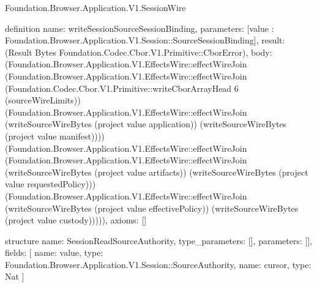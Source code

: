 \begin{lexlean}{Foundation.Browser.Application.V1.SessionWire}
\begin{semanticmodule}
definition{
  name: writeSessionSourceSessionBinding,
  parameters: [value : Foundation.Browser.Application.V1.Session::SourceSessionBinding],
  result: (Result Bytes Foundation.Codec.Cbor.V1.Primitive::CborError),
  body: (Foundation.Browser.Application.V1.EffectsWire::effectWireJoin (Foundation.Browser.Application.V1.EffectsWire::effectWireJoin (Foundation.Codec.Cbor.V1.Primitive::writeCborArrayHead 6 (sourceWireLimits)) (Foundation.Browser.Application.V1.EffectsWire::effectWireJoin (writeSourceWireBytes (project value application)) (writeSourceWireBytes (project value manifest)))) (Foundation.Browser.Application.V1.EffectsWire::effectWireJoin (Foundation.Browser.Application.V1.EffectsWire::effectWireJoin (writeSourceWireBytes (project value artifacts)) (writeSourceWireBytes (project value requestedPolicy))) (Foundation.Browser.Application.V1.EffectsWire::effectWireJoin (writeSourceWireBytes (project value effectivePolicy)) (writeSourceWireBytes (project value custody))))),
  axioms: []
}

structure{
  name: SessionReadSourceAuthority,
  type_parameters: [],
  parameters: [],
  fields: [
    {name: value, type: Foundation.Browser.Application.V1.Session::SourceAuthority},
    {name: cursor, type: Nat}
  ]
}


\end{semanticmodule}
\end{lexlean}
